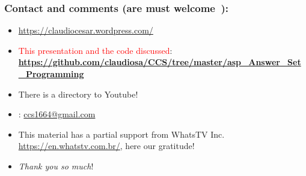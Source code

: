 \documentclass{beamer}
\begin{document}
\begin{frame}
\frametitle{Contact and comments (are must welcome\ \Smiley):}
  
\begin{block}{}
  \begin{itemize}
  \item \url{https://claudiocesar.wordpress.com/}
   \item \textcolor{red}{This presentation and the code discussed}:\\
   \textbf{\textcolor{blue}{\url{https://github.com/claudiosa/CCS/tree/master/asp_Answer_Set_Programming}}}
   \item There is a directory to Youtube!
    
  \item \Letter: \url{ccs1664@gmail.com}
  \item This material has a partial support from WhatsTV Inc. \url{https://en.whatstv.com.br/}, here our gratitude!
  \item \textit{Thank you so much}!

  \end{itemize}
  \end{block}

\end{frame}


\end{document}
